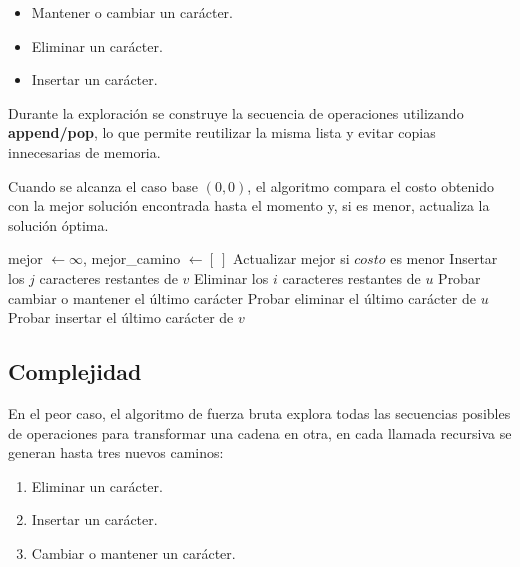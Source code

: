 \documentclass[12pt]{article}
\begin{document}
\begin{itemize}
    \item Mantener o cambiar un carácter.
    \item Eliminar un carácter.
    \item Insertar un carácter.
\end{itemize}

Durante la exploración se construye la secuencia de operaciones utilizando \textbf{append/pop}, lo que permite reutilizar la misma lista y evitar copias innecesarias de memoria.

Cuando se alcanza el caso base \((0,0)\), el algoritmo compara el costo obtenido con la mejor solución encontrada hasta el momento y, si es menor, actualiza la solución óptima.


\begin{algorithm}[H]
\caption{Fuerza bruta}
\begin{algorithmic}[1]
    \State mejor $\gets \infty$, mejor\_camino $\gets [\ ]$
            \State Actualizar mejor si $costo$ es menor
            \State \Return
        \EndIf
            \State Insertar los $j$ caracteres restantes de $v$
            \State \Return
        \EndIf
            \State Eliminar los $i$ caracteres restantes de $u$
            \State \Return
        \EndIf
        \State Probar cambiar o mantener el último carácter
        \State Probar eliminar el último carácter de $u$
        \State Probar insertar el último carácter de $v$
    \EndFunction
\EndFunction
\end{algorithmic}
\end{algorithm}

\subsection*{Complejidad}

En el peor caso, el algoritmo de fuerza bruta explora todas las secuencias posibles de operaciones para transformar una cadena en otra, en cada llamada recursiva se generan hasta tres nuevos caminos:
\begin{enumerate}
    \item Eliminar un carácter.
    \item Insertar un carácter.
    \item Cambiar o mantener un carácter.
\end{enumerate}
\end{document}

